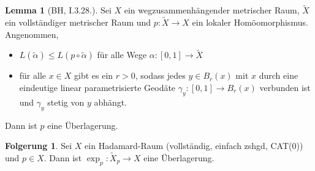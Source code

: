 \documentclass{beamer}
\newcommand{\I}{\left[0,1\right]} %
\renewcommand{\emph}[1]{\textcolor{Emph}{#1}}
\theoremstyle{definition}
\newtheorem*{lem}{Lemma}
\newtheorem*{bem}{Bemerkung}
\newtheorem*{folg}{Folgerung}
\begin{document}
\iffalse
\begin{frame}
  \begin{definition}
    Ein \emph{lokaler Homöomorphismus} ist eine stetige Abbildung $f : Y \to Z$ zwischen topologischen Räumen, für die gilt:

    Für alle $y \in Y$ eine Umgebung $U_y \subseteq Y$ von $y$ existiert, sodass $f(U_y)$ offen und
    \[ f|_{U_y} : U_y \to f(U_y) \]
    ein Homöomorphismus ist.
  \end{definition}

  \begin{bem}<2->
    \begin{itemize}
      \item Jeder lokale Isomorphismus ist ein lokaler Homöomorphismus.
      \item Jede Überlagerungsabbildung $p : \tilde{X} \to X$ ist ein lokaler Homöomorphismus, aber nicht jeder lokale Homöomorphismus ist eine Überlagerungsabbildung.
    \end{itemize}
  \end{bem}
\end{frame}
\fi

\begin{frame}
  \begin{lem}[BH, I.3.28.]
    Sei $X$ ein wegzusammenhängender metrischer Raum, $\tilde{X}$ ein vollständiger metrischer Raum und $p : \tilde{X} \to X$ ein lokaler Homöomorphismus. Angenommen,
    \begin{itemize}
      \item $L(\tilde{\alpha}) \leq L(p \circ \tilde{\alpha})$ für alle Wege $\alpha : \I \to \tilde{X}$
      \item für alle $x \in X$ gibt es ein $r > 0$, sodass jedes $y \in B_r(x)$ mit $x$ durch eine eindeutige linear parametrisierte Geodäte $\gamma_y : \I \to B_r(x)$ verbunden ist und $\gamma_y$ stetig von $y$ abhängt.
    \end{itemize}
    Dann ist $p$ eine Überlagerung.
  \end{lem}

  \begin{folg}
    Sei $X$ ein Hadamard-Raum (vollständig, einfach zshgd, CAT($0$)) und $p \in X$. Dann ist $\exp_p : \tilde{X}_p \to X$ eine Überlagerung.
  \end{folg}
\end{frame}
\end{document}
